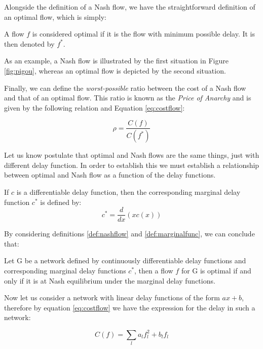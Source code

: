 Alongside the definition of a Nash flow, we have the straightforward definition of an optimal flow, which is simply:

\begin{definition}
 A flow $f$ is considered optimal if it is the flow with minimum possible delay. It is then denoted by $f^{*}$.
\end{definition}

As an example, a Nash flow is illustrated by the first situation in Figure \ref{fig:pigou}, whereas an optimal flow is depicted by the second situation.

Finally, we can define the \emph{worst-possible} ratio between the cost of a Nash flow and that of an optimal flow. This ratio is known as the \emph{Price of Anarchy} and is given by the following relation and Equation \ref{eq:costflow}:

\begin{equation}
 \rho = \frac{C(f)}{C(f^{*})}
  \label{eq:anarchy}
\end{equation}

Let us know postulate that optimal and Nash flows are the same things, just with different delay function. In order to establish this we must establish a relationship between optimal and Nash flow as a function of the delay functions.

\begin{definition}
 If $c$ is a differentiable delay function, then the corresponding marginal delay function $c^{*}$ is defined by:
\begin{equation}
 c^{*} = \frac{d}{dx}(x c(x))
\end{equation}
\label{def:marginalfunc}
\end{definition}

By considering definitions \ref{def:nashflow} and \ref{def:marginalfunc}, we can conclude that:

\begin{definition}
 Let G be a network defined by continuously differentiable delay functions and corresponding marginal delay functions $c^{*}$, then a flow $f$ for G is optimal if and only if it is at Nash equilibrium under the marginal delay functions.
\label{def:optinash}
\end{definition}

Now let us consider a network with linear delay functions of the form $ax+b$, therefore by equation \ref{eq:costflow} we have the expression for the delay in such a network:

\begin{equation}
 C(f) = \displaystyle\sum\limits_{l} a_{l}f_{l}^{2} + b_{l}f_{l}
\label{def:lindelay}
\end{equation}

